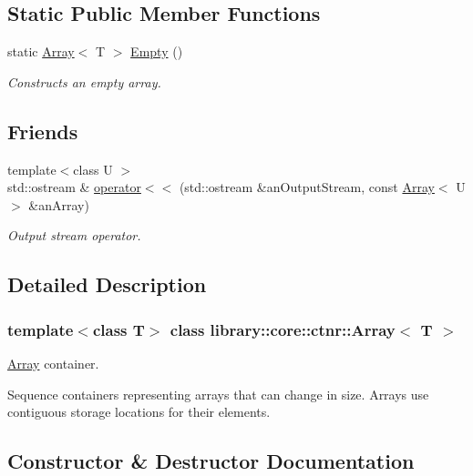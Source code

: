 \subsection*{Static Public Member Functions}
\begin{DoxyCompactItemize}
\item 
static \hyperlink{classlibrary_1_1core_1_1ctnr_1_1_array}{Array}$<$ T $>$ \hyperlink{classlibrary_1_1core_1_1ctnr_1_1_array_a7795ee997ae6008cd0bc8db607315524}{Empty} ()
\begin{DoxyCompactList}\small\item\em Constructs an empty array. \end{DoxyCompactList}\end{DoxyCompactItemize}
\subsection*{Friends}
\begin{DoxyCompactItemize}
\item 
{\footnotesize template$<$class U $>$ }\\std\+::ostream \& \hyperlink{classlibrary_1_1core_1_1ctnr_1_1_array_a9daa2d638e5bd693776f8bf6caae0802}{operator$<$$<$} (std\+::ostream \&an\+Output\+Stream, const \hyperlink{classlibrary_1_1core_1_1ctnr_1_1_array}{Array}$<$ U $>$ \&an\+Array)
\begin{DoxyCompactList}\small\item\em Output stream operator. \end{DoxyCompactList}\end{DoxyCompactItemize}


\subsection{Detailed Description}
\subsubsection*{template$<$class T$>$\newline
class library\+::core\+::ctnr\+::\+Array$<$ T $>$}

\hyperlink{classlibrary_1_1core_1_1ctnr_1_1_array}{Array} container. 

Sequence containers representing arrays that can change in size. Arrays use contiguous storage locations for their elements. 

\subsection{Constructor \& Destructor Documentation}
\mbox{\label{classlibrary_1_1core_1_1ctnr_1_1_array_a9b510b4e2a3f9d4a324dfd0feba01285}} 

